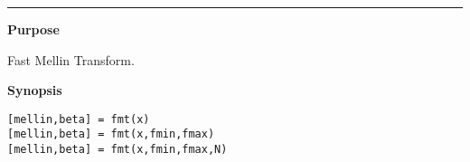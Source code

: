

\hspace*{-1.6cm}{\Large \bf fmt}

\vspace*{-.4cm}
\hspace*{-1.6cm}\rule[0in]{16.5cm}{.02cm}
\vspace*{.2cm}



{\bf \large {}\selectfont Purpose}\\
\hspace*{1.5cm}
\begin{minipage}[t]{13.5cm}
Fast Mellin Transform.
\end{minipage}
\vspace*{.5cm}


{\bf \large {}\selectfont Synopsis}\\
\hspace*{1.5cm}
\begin{minipage}[t]{13.5cm}
\begin{verbatim}
[mellin,beta] = fmt(x)
[mellin,beta] = fmt(x,fmin,fmax)
[mellin,beta] = fmt(x,fmin,fmax,N)
\end{verbatim}
\end{minipage}
\vspace*{.5cm}


